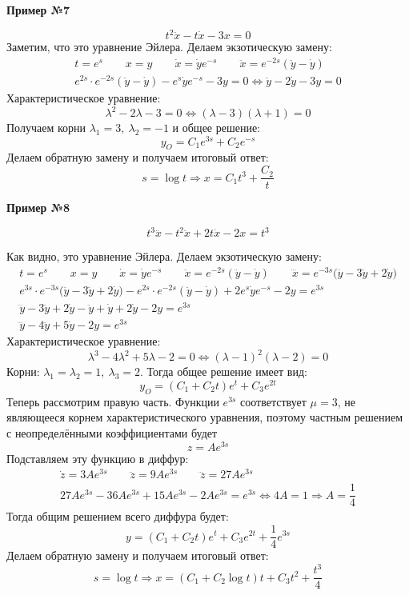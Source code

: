 \documentclass[a4paper,12pt]{article}
\newcommand{\dy}{\dot{y}}
\newcommand{\ddy}{\ddot{y}}
\newcommand{\dddy}{\dddot{y}}
\newcommand{\dx}{\dot{x}}
\newcommand{\ddx}{\ddot{x}}
\newcommand{\dddx}{\dddot{x}}
\newcommand{\dz}{\dot{z}}
\newcommand{\ddz}{\ddot{z}}
\newcommand{\dddz}{\dddot{z}}
\newcommand{\bto}{\Longrightarrow}
\begin{document}
\textbf{Пример №7}

\[t^2\ddx - t\dx - 3x = 0\]
Заметим, что это уравнение Эйлера.
Делаем экзотическую замену:
\begin{gather*}
	t = e^s\qquad x = y \qquad \dx = \dy e^{-s} \qquad \ddx = e^{-2s}\left(\ddy - \dy\right)\\
	e^{2s}\cdot e^{-2s}\left(\ddy - \dy\right) - e^s\dy e^{-s} - 3y = 0 \iff \ddy - 2\dy - 3y = 0
\end{gather*}
Характеристическое уравнение:
\[\lambda^2 - 2\lambda - 3 = 0 \iff (\lambda - 3)(\lambda + 1) = 0\]
Получаем корни $\lambda_1 = 3,\ \lambda_2 = -1$ и общее решение:
\[y_O = C_1e^{3s} + C_2e^{-s}\]
Делаем обратную замену и получаем итоговый ответ:
\[s = \log t \bto x = C_1t^3 + \dfrac{C_2}{t}\]

\textbf{Пример №8}

\[t^3\dddx - t^2\ddx + 2t\dx - 2x = t^3\]

Как видно, это уравнение Эйлера. Делаем экзотическую замену:
\begin{gather*}
t = e^s\qquad x = y \qquad \dx = \dy e^{-s} \qquad \ddx = e^{-2s}\left(\ddy - \dy\right)\qquad  \dddx = e^{-3s}\big(\dddy - 3\ddy + 2\dy\big)\\
e^{3s}\cdot e^{-3s}\big(\dddy - 3\ddy + 2\dy\big) - e^{2s}\cdot e^{-2s}\left(\ddy - \dy\right) + 2e^s\dy e^{-s} - 2y = e^{3s}\\
\dddy - 3\ddy + 2\dy - \ddy + \dy + 2\dy - 2y = e^{3s}\\
\dddy - 4\ddy + 5\dy - 2y = e^{3s}
\end{gather*}
Характеристическое уравнение:
\[\lambda^3 - 4\lambda^2 + 5\lambda - 2 = 0 \iff (\lambda - 1)^2(\lambda - 2) = 0\]
Корни: $\lambda_1 = \lambda_2 = 1,\ \lambda_3 = 2$.
Тогда общее решение имеет вид:
\[y_O = (C_1 + C_2t)e^t + C_3e^{2t}\]
Теперь рассмотрим правую часть.
Функции $e^{3s}$  соответствует $\mu = 3$, не являющееся корнем характеристического уравнения, поэтому частным решением с неопределёнными коэффициентами будет
\[z = Ae^{3s}\]
Подставляем эту функцию в диффур:
\begin{gather*}
	\dz = 3Ae^{3s}\qquad \ddz = 9Ae^{3s} \qquad \dddz = 27Ae^{3s}\\
	27Ae^{3s} - 36Ae^{3s} + 15Ae^{3s} - 2Ae^{3s} = e^{3s}\iff 4A = 1 \bto A = \dfrac{1}{4}
\end{gather*}
Тогда общим решением всего диффура будет:
\[y = (C_1 + C_2t)e^t + C_3e^{2t} + \dfrac{1}{4}e^{3s}\]
Делаем обратную замену и получаем итоговый ответ:
\[s = \log t \bto x = (C_1 + C_2\log t)t + C_3t^2 + \dfrac{t^3}{4}\]
\end{document}
